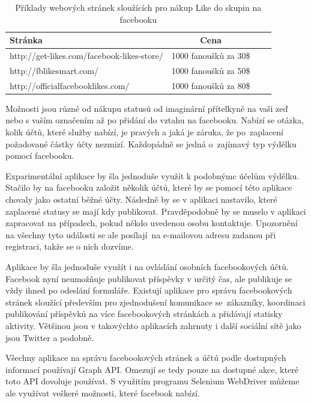 \documentclass[thesis=M,czech]{FITthesis}[2013/05/10]
\begin{document}
\begin{table}[h]
\centering
\caption{Příklady webových stránek sloužících pro nákup Like do skupin na facebooku}\label{tab:likesBuy}
\begin{tabular}{| l | c | p{5cm} | c |}
	\hline
	\textbf{Stránka} & 
	\textbf{Cena} \\ \hline
	
	http://get-likes.com/facebook-likes-store/ &
	1000 fanoušků za 30\$ \\ \hline
	
	http://fblikesmart.com/ &
	1000 fanoušků za 50\$ \\ \hline
	
	http://officialfacebooklikes.com/ &
	1000 fanoušků za 80\$ \\ \hline
\end{tabular}
\end{table}

Možnosti jsou různé od nákupu statusů od imaginární přítelkyně na vaši zeď nebo s vaším označením až po přidání do vztahu na facebooku. Nabízí se otázka, kolik účtů, které služby nabízí, je pravých a jaká je záruka, že po~zaplacení požadované částky  účty nezmizí. Každopádně se jedná o~zajímavý typ výdělku pomocí facebooku.

Exparimentální aplikace by šla jednoduše využít k podobnýmc účelům výdělku. Stačilo by na facebooku založit několik účtů, které by se pomocí této aplikace chovaly jako ostatní běžné účty. Následně by se v aplikaci nastavilo, které zaplacené statusy se mají kdy publikovat. Pravděpodobně by se muselo v aplikaci zapracovat na případech, pokud někdo uvedenou osobu kontaktuje. Upozornění na všechny tyto události se ale posílají~na e-mailovou adresu zadanou při registraci, takže se o nich dozvíme.

Aplikace by šla jednoduše využít i na ovládání osobních facebookových účtů. Facebook nyní neumožňuje publikovat příspěvky v určitý čas, ale publikuje se vždy ihned po odeslání formuláře. Existují aplikace pro správu facebookových stránek sloužící především pro zjednodušení komunikace se~zákazníky, koordinaci publikování příspěvků na více facebookových stránkách a přidávají statisky aktivity. Většinou jsou v takovýchto aplikacích zahrnuty i další sociální sítě jako jsou Twitter a podobně.

Všechny aplikace na správu facebookových stránek a účtú podle dostupných informací používají Graph API. Omezují se tedy pouze na dostupné akce, které toto API dovoluje používat. S využitím programu Selenium WebDriver můžeme ale využívat veškeré možnosti, které facebook nabízí.
\end{document}
